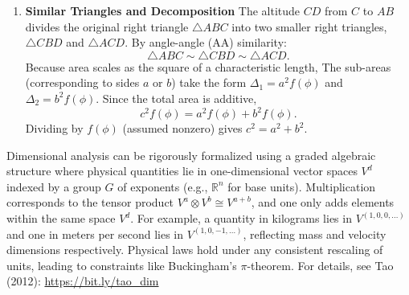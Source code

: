{\begin{enumerate}
\begin{center}
\begin{tikzpicture}[scale=1]
    \end{tikzpicture}
    \end{center}
    \item \textbf{Similar Triangles and Decomposition}  
    \newline
    The altitude $CD$ from $C$ to $AB$ divides the original right triangle $\triangle ABC$ into two smaller right triangles, $\triangle CBD$ and $\triangle ACD$. By angle-angle (AA) similarity:
    \[
    \triangle ABC \sim \triangle CBD \sim \triangle ACD.
    \]
    Because area scales as the square of a characteristic length, The sub-areas (corresponding to sides $a$ or $b$) take the form $\Delta_1 = a^2 f(\phi)$ and $\Delta_2 = b^2 f(\phi)$.
    Since the total area is additive,  
    \[
    c^2 f(\phi) = a^2 f(\phi) + b^2 f(\phi).
    \]
    Dividing by $f(\phi)$ (assumed nonzero) gives
    $c^2 = a^2 + b^2$.
\end{enumerate}
\vspace{0.5em}
Dimensional analysis can be rigorously formalized using a graded algebraic structure where physical quantities lie in one-dimensional vector spaces $V^d$ indexed by a group $G$ of exponents (e.g., $\mathbb{R}^n$ for base units). Multiplication corresponds to the tensor product $V^a \otimes V^b \cong V^{a+b}$, and one only adds elements within the same space $V^d$. For example, a quantity in kilograms lies in $V^{(1,0,0,\ldots)}$ and one in meters per second lies in $V^{(1,0,-1,\ldots)}$, reflecting mass and velocity dimensions respectively. Physical laws hold under any consistent rescaling of units, leading to constraints like Buckingham's $\pi$-theorem.  
For details, see Tao (2012):  
\href{https://terrytao.wordpress.com/2012/12/29/a-mathematical-formalisation-of-dimensional-analysis/}{\textrm{https://bit.ly/tao\_dim}}
}
